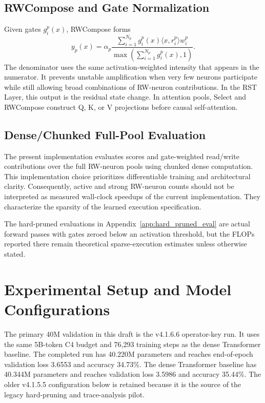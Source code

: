 \documentclass{article}
\begin{document}
\subsection{RWCompose and Gate Normalization}
\label{app:rwcompose_details}

Given gates $g_i^p(x)$, RWCompose forms
\begin{equation}
    y_p(x)
    =
    \alpha_p
    \frac{
    \sum_{i=1}^{N_p}g_i^p(x)\langle x,r_i^p\rangle w_i^p
    }{
    \max\left(\sum_{i=1}^{N_p}g_i^p(x),1\right)
    } .
\end{equation}
The denominator uses the same activation-weighted intensity that appears in the numerator. It prevents unstable amplification when very few neurons participate while still allowing broad combinations of RW-neuron contributions. In the RST Layer, this output is the residual state change. In attention pools, Select and RWCompose construct Q, K, or V projections before causal self-attention.

\subsection{Dense/Chunked Full-Pool Evaluation}

The present implementation evaluates scores and gate-weighted read/write contributions over the full RW-neuron pools using chunked dense computation. This implementation choice prioritizes differentiable training and architectural clarity. Consequently, active and strong RW-neuron counts should not be interpreted as measured wall-clock speedups of the current implementation. They characterize the sparsity of the learned execution specification.

The hard-pruned evaluations in Appendix~\ref{app:hard_pruned_eval} are actual forward passes with gates zeroed below an activation threshold, but the FLOPs reported there remain theoretical sparse-execution estimates unless otherwise stated.

\section{Experimental Setup and Model Configurations}
\label{app:forty_m_setup}

The primary 40M validation in this draft is the v4.1.6.6 operator-key run. It uses the same 5B-token C4 budget and 76{,}293 training steps as the dense Transformer baseline. The completed run has 40.220M parameters and reaches end-of-epoch validation loss 3.6553 and accuracy 34.73\%. The dense Transformer baseline has 40.344M parameters and reaches validation loss 3.5986 and accuracy 35.44\%. The older v4.1.5.5 configuration below is retained because it is the source of the legacy hard-pruning and trace-analysis pilot.
\end{document}
